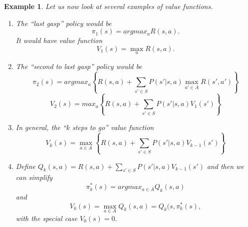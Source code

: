 \documentclass{amsart}
\newtheorem{eg}[subsection]{Example}
\begin{document}
\begin{eg}
Let us now look at several examples of value functions.
\begin{enumerate}
\item
The ``last gasp'' policy would be $$\pi_1(s)= argmax_a R(s,a).$$ It would have value function $$V_1(s) = \max_a R(s,a).$$
\item
The ``second to last gasp'' policy would be $$\pi_2(s) = argmax_a \left\{R(s,a)+\sum_{s' \in S} P(s'|s,a) \max_{a' \in A} R(s',a')\right\}$$
$$V_2(s) = max_a \left\{R(s,a)+\sum_{s' \in S} P(s'|s,a) V_1(s')\right\}$$
\item In general, the ``$k$ steps to go'' value function $$V_k(s) = \max_{a \in A} \left\{ R(s,a)+ \sum_{s' \in S} P(s'|s,a)V_{k-1}(s')\right\}$$
\item Define $Q_k(s,a) = R(s,a) + \sum_{s'\in S} P(s'|s,a) V_{k-1} (s')$ and then we can simplify $$\pi^*_k(s)= argmax_{a \in A} Q_k(s,a)$$ and $$V_k(s) = \max_{a \in A} Q_k(s,a)=Q_k(s,\pi_k^*(s),$$ with the special case $V_0(s) = 0.$
\end{enumerate}
\end{eg}
\end{document}

